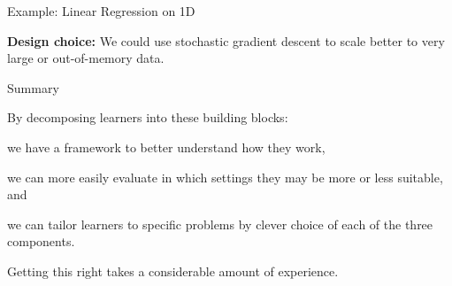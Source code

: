 \documentclass[11pt,compress,t,notes=noshow, xcolor=table]{beamer}
\begin{document}
\begin{vbframe}{Example: Linear Regression on 1D}
  \vfill
  
  \begin{figure}[!htb]

    
  \end{figure}

  \vfill

  \textbf{Design choice:} We could use stochastic gradient descent to scale better to very large or out-of-memory data.
  
\end{vbframe}



\begin{vbframe}{Summary}
  
  
  By decomposing learners into these building blocks:
  
  \vfill
  
  \begin{itemizeL}
    
    \item we have a framework to better understand how they work,
    
    \item we can more easily evaluate in which settings they may be more or less 
    suitable, and
    
    \item we can tailor learners to specific problems by clever choice of each 
    of the three components.
    
  \end{itemizeL}
  
  
  
  
  \vfill
  
  Getting this right takes a considerable amount of experience.
  
\end{vbframe}



\endlecture
\end{document}
